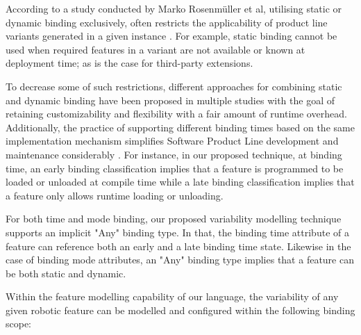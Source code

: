 \documentclass[conference]{IEEEtran}
\begin{document}
According to a study conducted by Marko Rosenmüller et al, utilising static or dynamic binding exclusively, often restricts the applicability of product line variants generated in a given instance \cite{flex-feat-bind}. For example, static binding cannot be used when required features in a variant are not available or known at deployment time; as is the case for third-party extensions. 

To decrease some of such restrictions, different approaches for combining static and dynamic binding have been proposed in multiple studies with the goal of retaining customizability and flexibility with a fair amount of runtime overhead. Additionally, the practice of supporting different binding times based on the same implementation mechanism simplifies Software Product Line development and maintenance considerably \cite{flex-feat-bind}. For instance, in our proposed technique, at binding time, an early binding classification implies that a feature is programmed to be loaded or unloaded at compile time while a late binding classification implies that a feature only allows runtime loading or unloading.

For both time and mode binding, our proposed variability modelling technique supports an implicit "Any" binding type. In that, the binding time attribute of a feature can reference both an early and a late binding time state. Likewise in the case of binding mode attributes, an "Any" binding type implies that a feature can be both static and dynamic.

Within the feature modelling capability of our language, the variability of any given robotic feature can be modelled and configured within the following binding scope:
\end{document}
